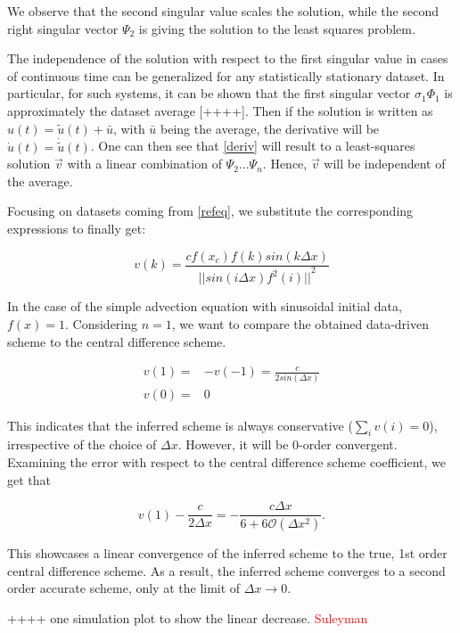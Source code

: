 \documentclass[%
  twocolumn
]{mpi2015-cscpreprint}
\begin{document}
We observe that the second singular value scales the solution, while the second right singular vector $\Psi_2$ is giving the solution to the least squares problem. 

The independence of the solution with respect to the first singular value in cases of continuous time can be generalized for any statistically stationary dataset. In particular, for such systems, it can be shown that the first singular vector $\sigma_1 \Phi_1$ is approximately the dataset average [++++]. Then if the solution is written as $u(t)=\tilde{u}(t)+\bar{u}$, with $\bar{u}$ being the average, the derivative will be $\dot{u}(t)=\dot{\tilde{u}}(t)$. One can then see that \ref{deriv} will result to a least-squares solution $\Vec{v}$ with a linear combination of $\Psi_2 ... \Psi_n$. Hence, $\Vec{v}$ will be independent of the average.

Focusing on datasets coming from \ref{refeq}, we substitute the corresponding expressions to finally get:

\begin{equation}
    v(k)=\frac{c f(x_c)f(k)sin(k \Delta x)}{{|| sin(i \Delta x) f^2(i)||}^2}
\end{equation}


In the case of the simple advection equation with sinusoidal initial data, $f(x)=1$. Considering $n=1$, we want to compare the obtained data-driven scheme to the central difference scheme.

\begin{align}
v(1)={}& -v(-1)=\frac{c}{2 sin(\Delta x)} \\
v(0)={}& 0
\end{align}

This indicates that the inferred scheme is always conservative ($\sum_i{v(i)}=0$), irrespective of the choice of $\Delta x$. However, it will be $0$-order convergent. Examining the error with respect to the central difference scheme coefficient, we get that

\begin{equation}
v(1)-\frac{c}{2 \Delta x}=-\frac{c \Delta x}{6 + 6\mathcal{O}(\Delta x ^2)}.
\end{equation}

This showcases a linear convergence of the inferred scheme to the true, 1st order central difference scheme. As a result, the inferred scheme converges to a second order accurate scheme, only at the limit of $\Delta x \to 0$. 

++++ one simulation plot to show the linear decrease. \textcolor{red}{Suleyman}
\end{document}
